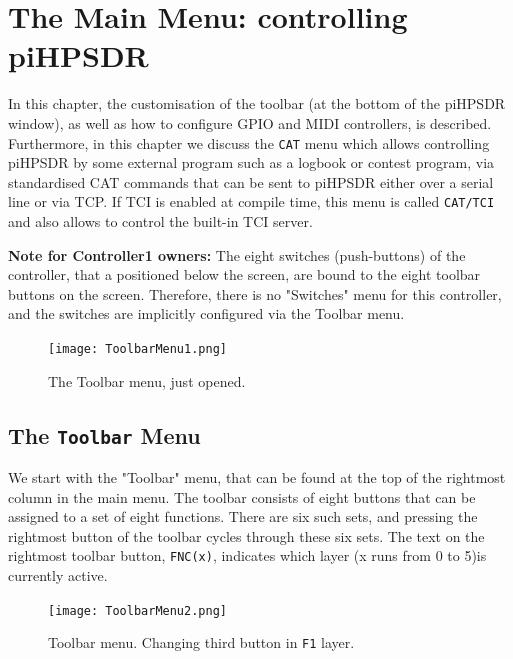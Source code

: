 \documentclass[12pt]{book}
\def\rett#1{\texttt{\color{red}#1}}
\def\bltt#1{\texttt{\color{blue}#1}}
\def\pH{pi\-HPSDR\xspace}
\begin{document}
\chapter[Controlling \pH]{The Main Menu: controlling \pH}

In this chapter, the customisation of the toolbar (at the bottom of the \pH window),
as well as how to configure GPIO and MIDI controllers, is described. Furthermore, in this
chapter we discuss the \bltt{CAT} menu which allows controlling \pH by some external program
such as a logbook or contest program, via standardised CAT commands that can be sent to
\pH either over a serial line or via TCP. If TCI is enabled at compile  time, this menu
is called \bltt{CAT/TCI} and also allows to control the built-in TCI server.

\textbf{Note for Controller1 owners:} The eight switches (push-buttons) of the controller,
that a positioned below the screen, are bound to the eight toolbar buttons on the screen.
Therefore, there is no "Switches" menu for this controller, and the switches are implicitly
configured via the Toolbar menu.

\begin{figure}[ht]
\center
\texttt{[image: ToolbarMenu1.png]}
\caption{The Toolbar menu, just opened.}
\label{fig:ToolbarMenu1}
\end{figure}

\section{The \texttt{Toolbar} Menu}
\label{sec:toolbarmenu}
We start with the "Toolbar" menu, that can be found at the top of the rightmost
column in the main menu. The toolbar consists of eight buttons that can be assigned
to a set of eight functions. There are six such sets, and pressing the rightmost button
of the toolbar cycles through these six sets. The text on the rightmost toolbar button, \rett{FNC(x)}, indicates which
layer (x runs from 0 to 5)is currently active.

\begin{figure}[ht!]
\center
\texttt{[image: ToolbarMenu2.png]}
\caption{Toolbar menu. Changing third button in \texttt{F1} layer.}
\label{fig:ToolbarMenu2}
\end{figure}
\end{document}
